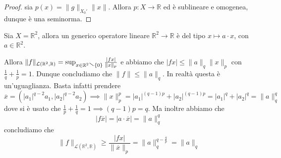 \begin{proof}{}
    sia \(p{(x)} = \|g\|_{X_{0}'} \|x\| \). Allora \(p : X\to \mathbb{R}\) ed è
    sublineare e omogenea, dunque è una seminorma. 
\end{proof}
\begin{example}{}
    Sia \(X = \mathbb{R}^2\), allora un generico operatore lineare \(\mathbb{R}^2\to \mathbb{R}\) è del tipo \(x \mapsto a \cdot x\), con \(a \in \mathbb{R}^2\).

    Allora \(\|f\|_{\mathcal{L}{(\mathbb{R}^2, \mathbb{R})}}  = \sup_{x \in \mathbb{R}^2\sminus \{0\} } \frac{|fx|}{\|x\|_p}\) 
    e abbiamo che \(|fx| \le \|a\|_q \|x\|_p\) con \(\frac{1}{q}+\frac{1}{p} = 1\). Dunque concludiamo che \(\|f\| \le \|a\|_q\). In realtà questa è un'uguaglianza. Basta infatti prendere 
    \[
      \overline{x} = {\left( |a_{1}|^{q-2}a_{1}, |a_{2}|^{q-2}a_{2} \right)} \implies \|x\|_p^{p} = |a_{1}|^{{(q-1)}p} + |a_{2}|^{{(q-1)}p} = |a_{1}|^{q} + |a_{2}|^{q} = \|a\|_q^{q}
    \]
dove si è usato che \(\frac{1}{p}+\frac{1}{q} = 1 \implies {(q-1)}p = q\). Ma
inoltre abbiamo che
\[
  |f\overline{x}| = |a \cdot \overline{x}| = \|a\|_q^{q}
\]
concludiamo che
\[
  \|f\|_{\mathcal{L}{(\mathbb{R}^2, \mathbb{R})}} \ge \frac{|fx|}{\|\overline{x}\|_p} = \|a\|_q^{q - \frac{q}{p}} = \|a\|_q
\]
\end{example}
